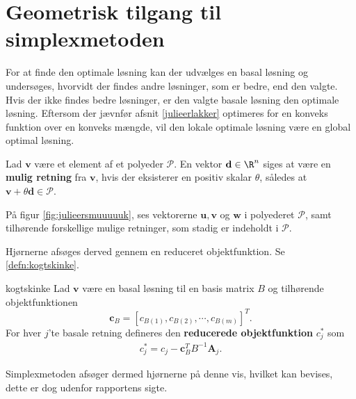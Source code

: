 \section{Geometrisk tilgang til simplexmetoden}
\label{julieerfantalastiskogvidunderlig}
%
For at finde den optimale løsning kan der udvælges en basal løsning og undersøges, hvorvidt der findes andre løsninger, som er bedre, end den valgte. 
Hvis der ikke findes bedre løsninger, er den valgte basale løsning den optimale løsning. 
Eftersom der jævnfør afsnit \ref{julieerlakker} optimeres for en konveks funktion over en konveks mængde, %
vil den lokale optimale løsning være en global optimal løsning. 
%
%
\begin{defn}{}{}
Lad $\textbf{v}$ være et element af et polyeder $\mathcal{P}$.
En vektor $\textbf{d}\in \R^n$ siges at være en  \textbf{mulig retning} fra $\textbf{v}$, hvis der eksisterer en positiv skalar $\theta$, således at $\textbf{v}+\theta \textbf{d}\in \mathcal{P}$.
\end{defn}
\noindent
%
På figur \ref{fig:julieersmuuuuuk}, ses vektorerne $\mathbf{u}, \mathbf{v}$ og $\mathbf{w}$ i polyederet $\mathcal{P}$, samt tilhørende forskellige mulige retninger, som stadig er indeholdt i $\mathcal{P}$.
%

%
Hjørnerne afsøges derved gennem en reduceret objektfunktion.
Se \ref{defn:kogtskinke}.
%
\begin{defn}{}{kogtskinke}
Lad $\mathbf{v}$ være en basal løsning til en basis matrix $B$ og tilhørende objektfunktionen $$\mathbf{c}_B=[ c_{B(1)},c_{B(2)}, \cdots , c_{B(m)} ]^T.$$
For hver $j$'te basale retning defineres den \textbf{reducerede objektfunktion} $c_j^*$ som
\begin{align*}
c_j^* = c_j - \mathbf{c}_B^T B^{-1} \mathbf{A}_j.
\end{align*} 
%
\end{defn}
\noindent
%
Simplexmetoden afsøger dermed hjørnerne på denne vis, hvilket kan bevises, dette er dog udenfor rapportens sigte.



	
	
	
	
	